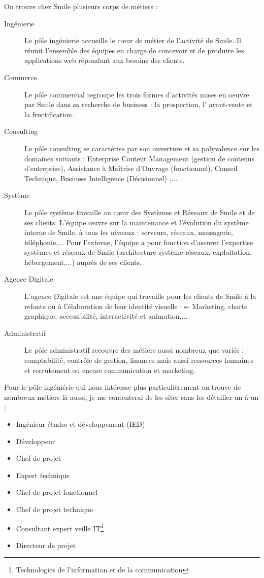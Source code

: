 \documentclass[a4paper,11pt,twoside]{report}
\begin{document}
  On trouve chez Smile plusieurs corps de métiers :\newline
  \begin{description}

    \item[Ingénierie] Le pôle ingénierie accueille le cœur de métier de l’activité de Smile. Il réunit l’ensemble des équipes en charge de concevoir et de produire les applications web répondant aux besoins des clients.
    \item[Commerce] Le pôle commercial regroupe les trois formes d’activités mises en oeuvre par Smile dans sa recherche de business : la prospection, l’ avant-vente et la fructification.
    \item[Consulting] Le pôle consulting se caractérise par son ouverture et sa polyvalence sur les domaines suivants : Enterprise Content Management (gestion de contenus d’entreprise), Assistance à Maîtrise d’Ouvrage (fonctionnel), Conseil Technique, Business Intelligence (Décisionnel) ,...
    \item[Système] Le pôle système travaille au cœur des Systèmes et Réseaux de Smile et de ses clients. L’équipe œuvre sur la maintenance et l’évolution du système interne de Smile, à tous les niveaux : serveurs, réseaux, messagerie, téléphonie,... Pour l’externe, l’équipe a pour fonction d’assurer l’expertise systèmes et réseaux de Smile (architecture système-réseaux, exploitation, hébergement,...) auprès de ses clients.
    \item[Agence Digitale] L'agence Digitale est une équipe qui travaille pour les clients de Smile à la refonte ou à l’élaboration de leur identité visuelle : e- Marketing, charte graphique, accessibilité, interactivité et animation,... 
    \item[Administratif] Le pôle administratif recouvre des métiers aussi nombreux que variés : comptabilité, contrôle de gestion, finances mais aussi ressources humaines et recrutement ou encore communication et marketing.
    \newline
    
  \end{description}
  
  Pour le pôle ingéniérie qui nous intéresse plus particulièrement on trouve de nombreux métiers là aussi, je me contenterai de les siter sans les détailler un à un :\newline
  \begin{itemize}

    \item Ingénieur études et développement (IED)
    \item Développeur
    \item Chef de projet
    \item Expert technique
    \item Chef de projet fonctionnel
    \item Chef de projet technique
    \item Consultant expert veille IT\footnote{Technologies de l'information et de la communication}
    \item Directeur de projet
    \newline
    
  \end{itemize}
  
\end{document}
